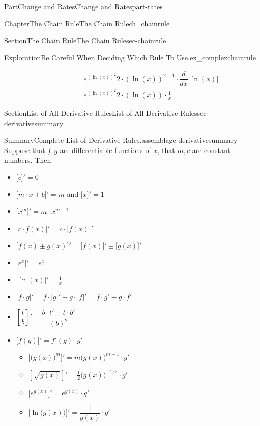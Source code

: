 \documentclass{tufte-book}
\numberwithin{equation}{chapter}
\newcommand{\ddx}[1]{ \dfrac{d}{dx} \Big[ #1 \Big]  }
\newcommand{\D}[1]{ \Big[ #1 \Big]'  }
\newcommand{\amp}{&}
\begin{document}
\begin{partptx}{Part}{Change and Rates}{}{Change and Rates}{}{}{part-rates}
\begin{chapterptx}{Chapter}{The Chain Rule}{}{The Chain Rule}{}{}{ch_chainrule}
\begin{sectionptx}{Section}{The Chain Rule}{}{The Chain Rule}{}{}{sec-chainrule}
\begin{exploration}{Exploration}{Be Careful When Deciding Which Rule To Use.}{ex_complexchainrule}
\begin{enumerate}[font=\bfseries,label=(\alph*),ref=\alph*]
\begin{align*}
\phantom{f'(x) } \amp = {e^{{(\ln(x))^2}}} 2\cdot  {(\ln(x))^{2-1}}\cdot \ddx{\ln(x)}\\
\amp = {e^{{(\ln(x))^2}}} 2\cdot  {(\ln(x))}\cdot \frac{1}{x}
\end{align*}
%
\end{enumerate}%
\end{exploration}%
\end{sectionptx}
%
%
\typeout{************************************************}
\typeout{************************************************}
%
\begin{sectionptx}{Section}{List of All Derivative Rules}{}{List of All Derivative Rules}{}{}{sec-derivativesummary}
\begin{assemblage}{Summary}{Complete List of Derivative Rules.}{assemblage-derivativesummary}%
Suppose that \(f,g\) are differentiable functions of \(x\), that \(m,c\) are constant numbers.  Then%
\begin{itemize}[label=\textbullet]
\item{}\(\displaystyle \D{c}=0\)%
\item{}\(\D{m\cdot x+b}=m\) and \(\D{x} = 1\)%
\item{}\(\displaystyle \D{x^m}=m\cdot x^{m-1}\)%
\item{}\(\displaystyle \D{ c\cdot f(x)}=c\cdot \D{f(x)}\)%
\item{}\(\displaystyle \D{f(x) \pm g(x)} = \D{f(x)} \pm \D{g(x)}\)%
\item{}\(\displaystyle \D{ e^x } = e^x \)%
\item{}\(\displaystyle \D{ \ln(x) } = \frac{1}{x}\)%
\item{}\(\displaystyle \Big[f\cdot g\Big]' = f\cdot \Big[g\Big]' + g\cdot \Big[f\Big]' = f\cdot g' + g\cdot f' \)%
\item{}\(\displaystyle \left[\dfrac{t}{b}\right]' = \dfrac{b\cdot t' - t\cdot b'}{(b)^2} \)%
\item{}\(\D{ f(g) } = f'(g)\cdot g'\)%
\begin{itemize}[label=$\circ$]
\item{}\(\displaystyle \D{ \big(g(x)\big)^m } = m \big(g(x)\big)^{m-1}\cdot g'\)%
\item{}\(\displaystyle \left[ \sqrt{g(x)} \right]' = \frac{1}{2}\Big( g(x) \Big)^{-1/2}\cdot g' \)%
\item{}\(\displaystyle \D{ e^{g(x)} } = e^{g(x)}\cdot g'\)%
\item{}\(\displaystyle \D{ \ln\big(g(x)\big) } = \dfrac{1}{g(x)}\cdot g'\)%

\end{itemize}
\end{itemize}
\end{assemblage}
\end{sectionptx}
\end{chapterptx}
\end{partptx}
\end{document}
